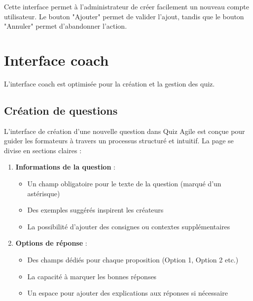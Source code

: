 \documentclass[12pt,a4paper]{report}
\begin{document}
Cette interface permet à l'administrateur de créer facilement un nouveau compte utilisateur. Le bouton "Ajouter" permet de valider l'ajout, tandis que le bouton "Annuler" permet d'abandonner l'action.

\section{Interface coach}

L'interface coach est optimisée pour la création et la gestion des quiz.

\subsection{Création de questions}

L'interface de création d'une nouvelle question dans Quiz Agile est conçue pour guider les formateurs à travers un processus structuré et intuitif. La page se divise en sections claires :

\begin{enumerate}
\item \textbf{Informations de la question} :
   \begin{itemize}
   \item Un champ obligatoire pour le texte de la question (marqué d'un astérisque)
   \item Des exemples suggérés inspirent les créateurs
   \item La possibilité d'ajouter des consignes ou contextes supplémentaires
   \end{itemize}

\item \textbf{Options de réponse} :
   \begin{itemize}
   \item Des champs dédiés pour chaque proposition (Option 1, Option 2 etc.)
   \item La capacité à marquer les bonnes réponses
   \item Un espace pour ajouter des explications aux réponses si nécessaire
   \end{itemize}
\end{enumerate}
\end{document}
